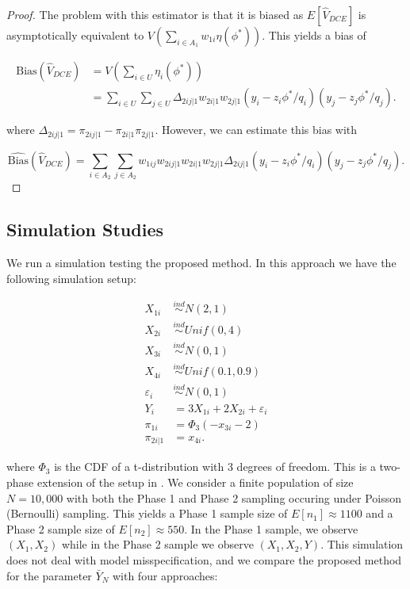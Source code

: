 \documentclass[12pt]{article}
\begin{document}
\begin{proof}
  The problem with this estimator is that it is biased as $E[\hat V_{DCE}]$ is
  asymptotically equivalent to
  $V\left(\sum_{i \in A_1} w_{1i} \eta(\phi^*)\right)$. This yields a bias of 

  \begin{align*}
    \text{Bias}(\hat V_{DCE}) 
    &= V\left(\sum_{i \in U} \eta_i(\phi^*)\right)\\ 
    &= \sum_{i \in U} \sum_{j \in U} \Delta_{2ij|1} w_{2i|1}
    w_{2j|1} (y_i - z_i \phi^* / q_i)(y_j - z_j \phi^* / q_j).
  \end{align*}

  where $\Delta_{2ij|1} = \pi_{2ij|1} - \pi_{2i|1} \pi_{2j|1}$. 
  However, we can estimate this bias with

  $$\widehat{\text{Bias}}(\hat V_{DCE}) = 
  \sum_{i \in A_2} \sum_{j \in A_2} w_{1ij} w_{2ij|1} w_{2i|1} w_{2j|1} 
  \Delta_{2ij|1} (y_i - z_i \phi^* / q_i)(y_j - z_j \phi^* / q_j).$$

\end{proof}

\subsection{Simulation Studies}

We run a simulation testing the proposed method. In this approach we have the
following simulation setup:

$$
\begin{aligned}
X_{1i} &\stackrel{ind}{\sim} N(2, 1) \\
X_{2i} &\stackrel{ind}{\sim} Unif(0, 4) \\
X_{3i} &\stackrel{ind}{\sim} N(0, 1) \\
X_{4i} &\stackrel{ind}{\sim} Unif(0.1, 0.9) \\
\varepsilon_i &\stackrel{ind}{\sim} N(0, 1) \\
Y_{i} &= 3 X_{1i} + 2 X_{2i} + \varepsilon_i \\
\pi_{1i} &= \Phi_3(-x_{3i} - 2) \\
\pi_{2i|1} &= x_{4i}.
\end{aligned}
$$

where $\Phi_3$ is the CDF of a t-distribution with 3 degrees of freedom.
This is a two-phase extension of the setup in \cite{kwon2024debiased}. We
consider a finite population of size $N = 10,000$ with both the Phase 1 and
Phase 2 sampling occuring under Poisson (Bernoulli) sampling. This yields a
Phase 1 sample
size of $E[n_1] \approx 1100$ and a Phase 2 sample size of
$E[n_2] \approx 550$. In the Phase 1 sample, we observe 
$(X_1, X_2)$ while in the Phase 2 sample we observe $(X_1, X_2, Y)$. This
simulation does not deal with model misspecification, and we compare the
proposed method for the parameter $\bar Y_N$ with four approaches:
\end{document}
